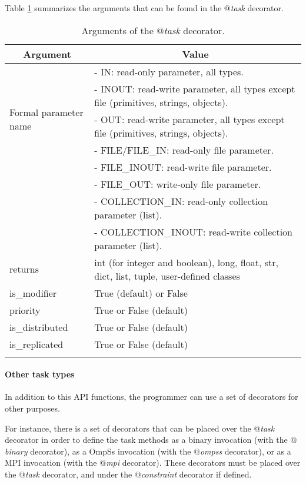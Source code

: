 Table \ref{tab:task_decorator_arguments} summarizes the arguments that can be found in the {\it $@$task} decorator.

\bgroup
  \def\arraystretch{1.5}%
  \begin{longtable}{| p{} | p{} |}
    \hline
    \multicolumn{1}{|c|}{{\bf Argument }}    &  \multicolumn{1}{c|}{{\bf Value }}\\
    \hline
    \multirow{5}{*}{Formal parameter name}  &  - IN: read-only parameter, all types. \\
    & - INOUT: read-write parameter, all types except file (primitives, strings, objects). \\
    & - OUT: read-write parameter, all types except file (primitives, strings, objects). \\
    & - FILE/FILE\_IN: read-only file parameter. \\
    & - FILE\_INOUT: read-write file parameter. \\
    & - FILE\_OUT: write-only file parameter. \\
    & - COLLECTION\_IN: read-only collection parameter (list). \\
    & - COLLECTION\_INOUT: read-write collection parameter (list). \\
    \hline
    returns & int (for integer and boolean), long, float, str, dict, list, tuple, user-defined classes \\
    \hline
    is\_modifier &  True (default) or False \\
    \hline
    priority  & True or False (default) \\
    \hline
    is\_distributed & True or False (default) \\
    \hline
    is\_replicated  & True or False (default) \\
    \hline
    \caption{Arguments of the {\it $@$task} decorator.}
    \label{tab:task_decorator_arguments}
  \end{longtable}
\egroup


\paragraph{Other task types}
\label{par:other_decorators}

In addition to this API functions, the programmer can use a set of decorators for other purposes.

For instance, there is a set of decorators that can be placed over the {\it $@$task} decorator in order to 
define the task methods as a binary invocation (with the {\it $@$binary} decorator), as a OmpSs invocation 
(with the {\it $@$ompss} decorator), or as a MPI invocation (with the {\it $@$mpi} decorator).
These decorators must be placed over the {\it $@$task} decorator, and under the {\it $@$constraint} decorator if 
defined.

